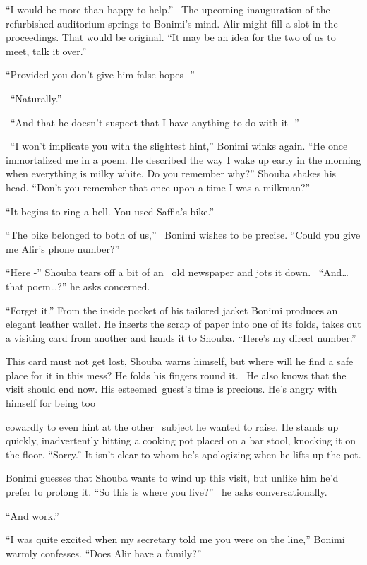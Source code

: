 \documentclass[twoside,11pt]{book}
\begin{document}
``I would be more than happy to help.'' \ The upcoming inauguration of the refurbished
auditorium springs to Bonimi's mind. Alir might fill a slot in the proceedings. That would be original.
``It may be an idea for the two of us to meet, talk it over.''

``Provided you don't give him false hopes -''

~``Naturally.''

~``And that he doesn't suspect that I have anything to do with it -''

~``I won't implicate you with the slightest hint,'' Bonimi winks again. ``He once
immortalized me in a poem. He described the way I wake up early in the morning when everything is milky white. Do you
remember why?'' Shouba shakes his head. ``Don't you remember that once upon a time I was a
milkman?''

``It begins to ring a bell. You used Saffia's bike.''

``The bike belonged to both of us,'' \ Bonimi wishes to be precise. ``Could you
give me Alir's phone number?''

``Here -'' Shouba tears off {a bit of an \ }old newspaper and jots it down.
\ ``And{\dots} that poem{\dots}?'' he asks concerned.

``Forget it.'' From the inside pocket of his tailored jacket Bonimi produces an elegant
leather wallet. He inserts the scrap of paper into one of its folds, takes out a visiting card from another and hands
it to Shouba. ``Here's my direct number.''

This card must not get lost, Shouba warns himself, but where will he find a safe place for it in this mess? He folds his
fingers round it. \ He also knows that the visit should end now. His esteemed~guest's time is precious.
He's{ }angry with himself for being too

cowardly to even hint at the other \ subject he wanted to raise. He stands up quickly, inadvertently hitting a cooking
pot placed on a bar stool, knocking it on the floor. ``Sorry.'' It isn't clear to whom he's
apologizing when he lifts up the pot.

Bonimi guesses that Shouba wants to wind up this visit, but unlike him he'd prefer to prolong it. ``So this
is where you live?'' \ he asks conversationally.

``And work.''

``I was quite excited when my secretary told me you were on the line,'' Bonimi warmly
confesses. ``Does Alir have a family?''
\end{document}
